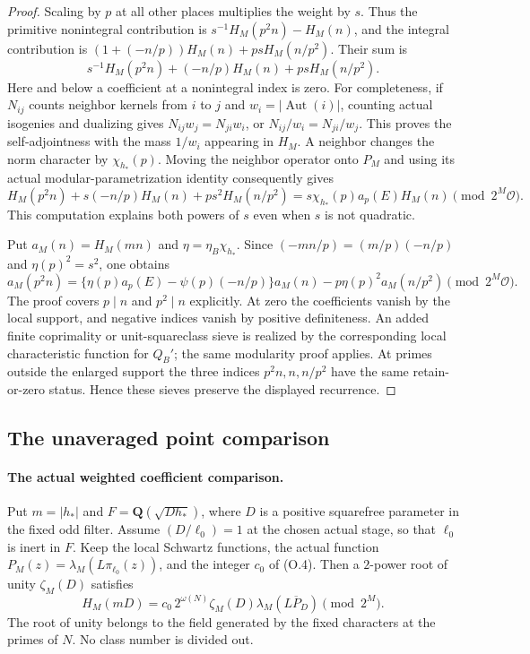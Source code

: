 \begin{proof}
Scaling by $p$ at all other places multiplies the weight by $s$.
Thus the primitive nonintegral contribution is
$s^{-1}H_M(p^2n)-H_M(n)$, and the integral contribution is
$(1+(-n/p))H_M(n)+psH_M(n/p^2)$.  Their sum is
\[
 s^{-1}H_M(p^2n)+(-n/p)H_M(n)+psH_M(n/p^2).
\]
Here and below a coefficient at a nonintegral index is zero.
For completeness, if $N_{ij}$ counts neighbor kernels from
$i$ to $j$ and $w_i=|\operatorname{Aut}(i)|$, counting actual
isogenies and dualizing gives
$N_{ij}w_j=N_{ji}w_i$, or $N_{ij}/w_i=N_{ji}/w_j$.
This proves the self-adjointness with the mass $1/w_i$ appearing
in $H_M$.  A neighbor changes the norm character by
$\chi_{h_*}(p)$.  Moving the neighbor operator onto $P_M$ and
using its actual modular-parametrization identity consequently
gives
\[
 H_M(p^2n)+s(-n/p)H_M(n)+ps^2H_M(n/p^2)
     =s\chi_{h_*}(p)a_p(E)H_M(n)\pmod {2^M\mathcal O}.
\]
This computation explains both powers of $s$ even when $s$ is
not quadratic.

Put $a_M(n)=H_M(mn)$ and
$\eta=\eta_B\chi_{h_*}$.  Since
$(-mn/p)=(m/p)(-n/p)$ and $\eta(p)^2=s^2$, one obtains
\[
 a_M(p^2n)=
 \{\eta(p)a_p(E)-\psi(p)(-n/p)\}a_M(n)
        -p\eta(p)^2a_M(n/p^2)\pmod {2^M\mathcal O}. \tag{O.6}
\]
The proof covers $p\mid n$ and $p^2\mid n$ explicitly.
At zero the coefficients vanish by the local support, and negative
indices vanish by positive definiteness.
An added finite coprimality or unit-squareclass sieve is realized
by the corresponding local characteristic function for $Q_B'$;
the same modularity proof applies.  At primes outside the enlarged
support the three indices $p^2n,n,n/p^2$ have the same retain-or-zero
status.  Hence these sieves preserve the displayed recurrence.
\end{proof}

\subsection{The unaveraged point comparison}
\paragraph{The actual weighted coefficient comparison.}
\begin{proposition}
\label{ex:app-theta-comparison}
Put $m=|h_*|$ and $F=\mathbf Q(\sqrt{Dh_*})$, where $D$ is a
positive squarefree parameter in the fixed odd filter. Assume
$(D/\ell_0)=1$ at the chosen actual stage, so that $\ell_0$ is
inert in $F$. Keep the local Schwartz functions, the actual function
$P_M(z)=\lambda_M(L\pi_{\ell_0}(z))$, and the integer $c_0$
of (O.4). Then a $2$-power root of unity $\zeta_M(D)$ satisfies
\[
 H_M(mD)=c_0\,2^{\omega(N)}\zeta_M(D)
                   \lambda_M(\overline{LP_D})\pmod {2^M}.\tag{O.7}
\]
The root of unity belongs to the field generated by the fixed
characters at the primes of $N$. No class number is divided out.
\end{proposition}


